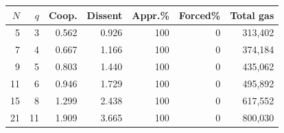 \begin{tabular}{@{}rrrrrrr@{}}
\toprule
$N$ & $q$ & Coop. & Dissent & Appr.\% & Forced\% & Total gas \\
\midrule
5 & 3 & 0.562 & 0.926 & 100 & 0 & 313{,}402 \\
7 & 4 & 0.667 & 1.166 & 100 & 0 & 374{,}184 \\
9 & 5 & 0.803 & 1.440 & 100 & 0 & 435{,}062 \\
11 & 6 & 0.946 & 1.729 & 100 & 0 & 495{,}892 \\
15 & 8 & 1.299 & 2.438 & 100 & 0 & 617{,}552 \\
21 & 11 & 1.909 & 3.665 & 100 & 0 & 800{,}030 \\
\bottomrule
\end{tabular}